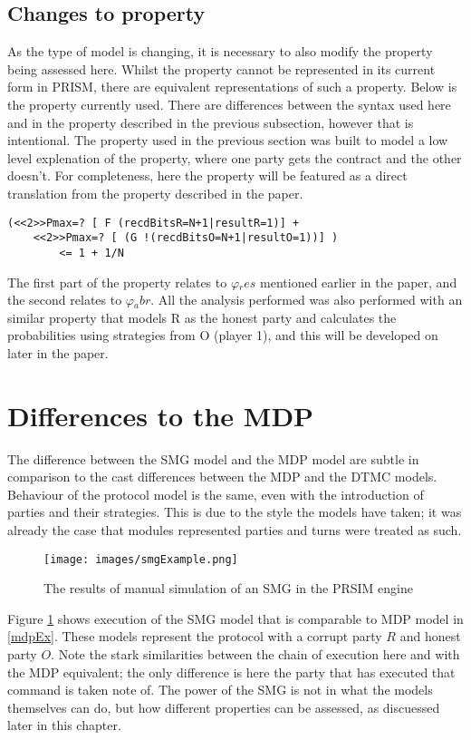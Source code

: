 \documentclass{l4proj}
\begin{document}
\subsection{Changes to property}

As the type of model is changing, it is necessary to also modify the property being assessed here. Whilst the property cannot be represented in its current form in PRISM, there are equivalent representations of such a property. Below is the property currently used. There are differences between the syntax used here and in the property described in the previous subsection, however that is intentional. The property used in the previous section was built to model a low level explenation of the property, where one party gets the contract and the other doesn't. For completeness, here the property will be featured as a direct translation from the property described in the paper. 

\begin{lstlisting}
(<<2>>Pmax=? [ F (recdBitsR=N+1|resultR=1)] + 
    <<2>>Pmax=? [ (G !(recdBitsO=N+1|resultO=1))] ) 
        <= 1 + 1/N
\end{lstlisting}

The first part of the property relates to $\varphi{_res}$ mentioned earlier in the paper, and the second relates to $\varphi{_abr}$. All the analysis performed was also performed with an similar property that models R as the honest party and calculates the probabilities using strategies from O (player 1), and this will be developed on later in the paper. 

\section{Differences to the MDP}

The difference between the SMG model and the MDP model are subtle in comparison to the cast differences between the MDP and the DTMC models. Behaviour of the protocol model is the same, even with the introduction of parties and their strategies. This is due to the style the models have taken; it was already the case that modules represented parties and turns were treated as such. 

\begin{figure}[ht!]
\centering
\texttt{[image: images/smgExample.png]}
\caption{The results of manual simulation of an SMG in the PRSIM engine}
\label{smgEx}
\end{figure}

Figure \ref{smgEx} shows execution of the SMG model that is comparable to MDP model in \ref{mdpEx}. These models represent the protocol with a corrupt party $R$ and honest party $O$. Note the stark similarities between the chain of execution here and with the MDP equivalent; the only difference is here the party that has executed that command is taken note of. The power of the SMG is not in what the models themselves can do, but how different properties can be assessed, as discuessed later in this chapter.
\end{document}
